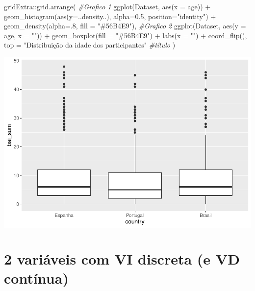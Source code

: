 \documentclass[
]{book}
\newenvironment{Shaded}{\begin{snugshade}}{\end{snugshade}}
\newcommand{\AttributeTok}[1]{\textcolor[rgb]{0.77,0.63,0.00}{#1}}
\newcommand{\CommentTok}[1]{\textcolor[rgb]{0.56,0.35,0.01}{\textit{#1}}}
\newcommand{\DecValTok}[1]{\textcolor[rgb]{0.00,0.00,0.81}{#1}}
\newcommand{\FloatTok}[1]{\textcolor[rgb]{0.00,0.00,0.81}{#1}}
\newcommand{\FunctionTok}[1]{\textcolor[rgb]{0.00,0.00,0.00}{#1}}
\newcommand{\NormalTok}[1]{#1}
\newcommand{\SpecialCharTok}[1]{\textcolor[rgb]{0.00,0.00,0.00}{#1}}
\newcommand{\StringTok}[1]{\textcolor[rgb]{0.31,0.60,0.02}{#1}}
\begin{document}
\begin{Shaded}
\begin{Highlighting}[]
\NormalTok{gridExtra}\SpecialCharTok{::}\FunctionTok{grid.arrange}\NormalTok{(}
  \CommentTok{\#Grafico 1}
  \FunctionTok{ggplot}\NormalTok{(Dataset, }\FunctionTok{aes}\NormalTok{(}\AttributeTok{x =}\NormalTok{ age)) }\SpecialCharTok{+}
    \FunctionTok{geom\_histogram}\NormalTok{(}\FunctionTok{aes}\NormalTok{(}\AttributeTok{y=}\NormalTok{..density..), }\AttributeTok{alpha=}\FloatTok{0.5}\NormalTok{, }
                   \AttributeTok{position=}\StringTok{"identity"}\NormalTok{) }\SpecialCharTok{+} 
    \FunctionTok{geom\_density}\NormalTok{(}\AttributeTok{alpha=}\NormalTok{.}\DecValTok{8}\NormalTok{, }\AttributeTok{fill =} \StringTok{"\#56B4E9"}\NormalTok{),}
  \CommentTok{\#Grafico 2}
  \FunctionTok{ggplot}\NormalTok{(Dataset, }\FunctionTok{aes}\NormalTok{(}\AttributeTok{y =}\NormalTok{ age, }\AttributeTok{x =} \StringTok{""}\NormalTok{)) }\SpecialCharTok{+}
  \FunctionTok{geom\_boxplot}\NormalTok{(}\AttributeTok{fill =} \StringTok{"\#56B4E9"}\NormalTok{) }\SpecialCharTok{+} \FunctionTok{labs}\NormalTok{(}\AttributeTok{x =} \StringTok{""}\NormalTok{) }\SpecialCharTok{+}
  \FunctionTok{coord\_flip}\NormalTok{(),}
  \AttributeTok{top =} \StringTok{"Distribuição da idade dos participantes"} \CommentTok{\#título}
\NormalTok{)}
\end{Highlighting}
\end{Shaded}

\begin{center}\includegraphics{gitbook-demo_files/figure-latex/unnamed-chunk-21-1} \end{center}

\hypertarget{variuxe1veis-com-vi-discreta-e-vd-contuxednua}{%
\section{2 variáveis com VI discreta (e VD contínua)}\label{variuxe1veis-com-vi-discreta-e-vd-contuxednua}}
\end{document}
